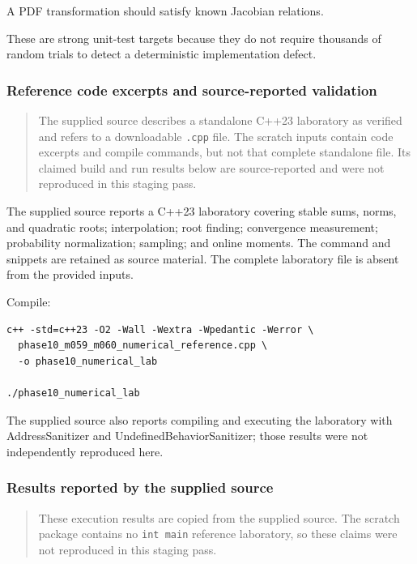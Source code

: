 A PDF transformation should satisfy known Jacobian relations.

These are strong unit-test targets because they do not require thousands of random trials to detect a deterministic implementation defect.

\subsubsection{Reference code excerpts and source-reported validation}\label{reference-code-excerpts-and-source-reported-validation}

\begin{quote}
The supplied source describes a standalone C++23 laboratory as verified and refers to a downloadable \texttt{.cpp} file. The scratch inputs contain code excerpts and compile commands, but not that complete standalone file. Its claimed build and run results below are source-reported and were not reproduced in this staging pass.
\end{quote}

The supplied source reports a C++23 laboratory covering stable sums, norms, and quadratic roots; interpolation; root finding; convergence measurement; probability normalization; sampling; and online moments. The command and snippets are retained as source material. The complete laboratory file is absent from the provided inputs.

Compile:

\begin{verbatim}
c++ -std=c++23 -O2 -Wall -Wextra -Wpedantic -Werror \
  phase10_m059_m060_numerical_reference.cpp \
  -o phase10_numerical_lab

./phase10_numerical_lab
\end{verbatim}

The supplied source also reports compiling and executing the laboratory with AddressSanitizer and UndefinedBehaviorSanitizer; those results were not independently reproduced here.

\subsubsection{Results reported by the supplied source}\label{results-reported-by-the-supplied-source}

\begin{quote}
These execution results are copied from the supplied source. The scratch package contains no \texttt{int\ main} reference laboratory, so these claims were not reproduced in this staging pass.
\end{quote}

